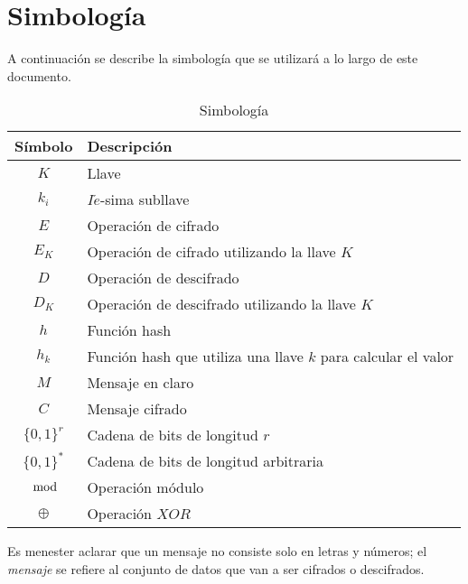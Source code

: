 \section*{Simbología}

A continuación se describe la simbología que se utilizará a lo largo de
este documento.

\begin{table}[H]
  \caption{Simbología}\label{tab:simb}
  \begin{center}
    \begin{tabular}{c|l}
      Símbolo & Descripción \\
      \hline
      $K$ & Llave \\
      \hline
      $k_i$ & $I\acute{e}$-sima subllave \\
      \hline
      $E$ & Operación de cifrado \\
      \hline
      $E_K$ & Operación de cifrado utilizando la llave $K$ \\
      \hline
      $D$ & Operación de descifrado \\
      \hline
      $D_K$ & Operación de descifrado utilizando la llave $K$ \\
      \hline
      $h$ & Función hash \\
      \hline
      $h_k$ & Función hash que utiliza una llave $k$ para calcular el valor\\
      \hline
      $M$ & Mensaje en claro\\
      \hline
      $C$ & Mensaje cifrado\\
      \hline
      $\{0,1\}^r$ & Cadena de bits de longitud $r$ \\
      \hline
      $\{0,1\}^*$ & Cadena de bits de longitud arbitraria \\
      \hline
      $\mod$ & Operación módulo \\
      \hline
      $\oplus$ & Operación $XOR$ \\
      \hline
    \end{tabular}
  \end{center}
\end{table}

Es menester aclarar que un mensaje no consiste solo en letras y números;
el \textit{mensaje} se refiere al conjunto de datos que van a ser
cifrados o descifrados.
